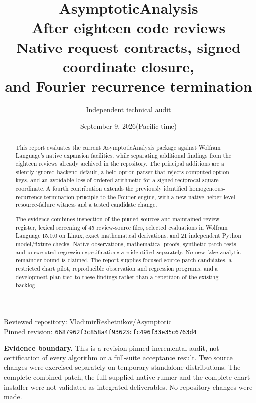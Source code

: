 \documentclass[11pt,a4paper]{article}
\title{\vspace{-12mm}\Huge AsymptoticAnalysis\\[4mm]\Large After eighteen code reviews\\[4mm]\large Native request contracts, signed coordinate closure,\\and Fourier recurrence termination}
\author{Independent technical audit}
\date{September 9, 2026\quad(Pacific time)}
\newcommand{\rev}{\texttt{6687962f3c858a4f93623cfc496f33e35c6763d4}}
\newcommand{\repo}{https://github.com/VladimirReshetnikov/Asymptotic}
\begin{document}
\maketitle
\thispagestyle{empty}
\begin{center}
\small Reviewed repository: \href{\repo}{VladimirReshetnikov/Asymptotic}\\[2mm]
Pinned revision: \rev
\end{center}
\vspace{4mm}
\begin{abstract}
This report evaluates the current AsymptoticAnalysis package against Wolfram Language's native expansion facilities, while separating additional findings from the eighteen reviews already archived in the repository. The principal additions are a silently ignored backend default, a held-option parser that rejects computed option keys, and an avoidable loss of ordered arithmetic for a signed reciprocal-square coordinate. A fourth contribution extends the previously identified homogeneous-recurrence termination principle to the Fourier engine, with a new native helper-level resource-failure witness and a tested candidate change.

The evidence combines inspection of the pinned sources and maintained review register, lexical screening of 45 review-source files, selected evaluations in Wolfram Language 15.0.0 on Linux, exact mathematical derivations, and 21 independent Python model/fixture checks. Native observations, mathematical proofs, synthetic patch tests and unexecuted regression specifications are identified separately. No new false analytic remainder bound is claimed. The report supplies focused source-patch candidates, a restricted chart pilot, reproducible observation and regression programs, and a development plan tied to these findings rather than a repetition of the existing backlog.
\end{abstract}
\vfill
\small\textbf{Evidence boundary.} This is a revision-pinned incremental audit, not certification of every algorithm or a full-suite acceptance result. Two source changes were exercised separately on temporary standalone distributions. The complete combined patch, the full supplied native runner and the complete chart installer were not validated as integrated deliverables. No repository changes were made.
\clearpage
\tableofcontents
\clearpage
\end{document}

